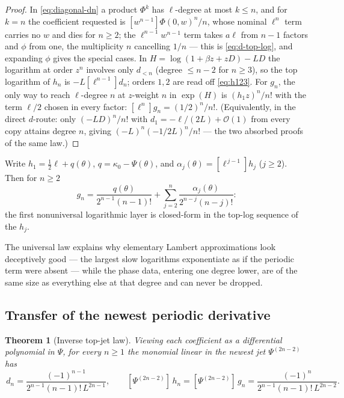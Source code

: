 \documentclass[11pt,oneside]{article}
\numberwithin{equation}{section}
\newtheorem{theorem}{Theorem}[section]
\theoremstyle{definition}
\theoremstyle{remark}
\newcommand{\bigO}{\mathcal O}
\begin{document}
\begin{proof}
In \eqref{eq:diagonal-dn} a product $\Phi^{k}$ has $\ell$-degree at
most $k\le n$, and for $k=n$ the coefficient requested is
$[w^{n-1}]\Phi(0,w)^{n}/n$, whose nominal $\ell^{n}$ term carries no
$w$ and dies for $n\ge2$; the $\ell^{n-1}w^{n-1}$ term takes
$a\ell$ from $n-1$ factors and $\phi$ from one, the multiplicity $n$
cancelling $1/n$ --- this is \eqref{eq:d-top-log}, and expanding
$\phi$ gives the special cases.  In $H=\log(1+\beta z+zD)-LD$ the
logarithm at order $z^{n}$ involves only $d_{<n}$ (degree
$\le n-2$ for $n\ge3$), so the top logarithm of $h_n$ is
$-L[\ell^{n-1}]d_n$; orders $1,2$ are read off
\eqref{eq:h123}.  For $g_n$, the only way to reach $\ell$-degree $n$
at $z$-weight $n$ in $\exp(H)$ is $(h_1z)^{n}/n!$ with the term
$\ell/2$ chosen in every factor:
$[\ell^{n}]g_n=(1/2)^{n}/n!$.  (Equivalently, in the direct
$d$-route: only $(-LD)^{n}/n!$ with $d_1=-\ell/(2L)+\bigO(1)$ from
every copy attains degree $n$, giving
$(-L)^{n}(-1/2L)^{n}/n!$ --- the two absorbed proofs of the same
law.)
\end{proof}

\begin{corollary}
\label{cor:subleading}
Write $h_1=\tfrac12\ell+q(\theta)$,
$q=\kappa_0-\Psi(\theta)$, and $\alpha_j(\theta)=[\ell^{\,j-1}]h_j$
($j\ge2$).  Then for $n\ge2$
\begin{equation}
 [\ell^{\,n-1}]\,g_n
 =\frac{q(\theta)}{2^{n-1}(n-1)!}
 +\sum_{j=2}^{n}\frac{\alpha_j(\theta)}{2^{n-j}(n-j)!}:
 \label{eq:subleading}
\end{equation}
the first nonuniversal logarithmic layer is closed-form in the
top-log sequence of the $h_j$.
\end{corollary}

The universal law explains why elementary Lambert approximations look
deceptively good --- the largest slow logarithms exponentiate as if
the periodic term were absent --- while the phase data, entering one
degree lower, are of the same size as everything else at that degree
and can never be dropped.

\subsection{Transfer of the newest periodic derivative}

\begin{theorem}[Inverse top-jet law]
\label{thm:inverse-topjet}
Viewing each coefficient as a differential polynomial in $\Psi$, for
every $n\ge1$ the monomial linear in the newest jet
$\Psi^{(2n-2)}$ has
\begin{equation}
 [\Psi^{(2n-2)}]\,d_n
 =\frac{(-1)^{n-1}}{2^{n-1}(n-1)!\,L^{2n-1}},
 \qquad
 [\Psi^{(2n-2)}]\,h_n
 =[\Psi^{(2n-2)}]\,g_n
 =\frac{(-1)^{n}}{2^{n-1}(n-1)!\,L^{2n-2}}.
 \label{eq:inverse-topjet}
\end{equation}
\end{theorem}
\end{document}
